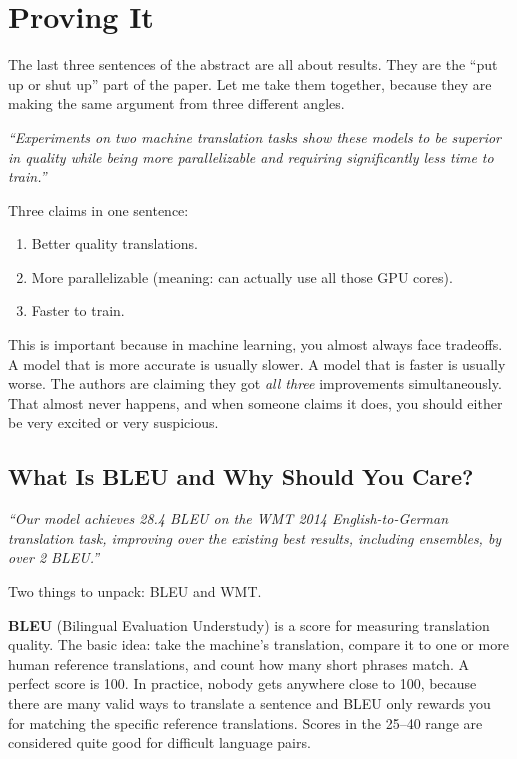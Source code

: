 \section{Proving It}

The last three sentences of the abstract are all about results.
They are the ``put up or shut up'' part of the paper.
Let me take them together, because they are making the same argument from three different angles.

\emph{``Experiments on two machine translation tasks show these models to be superior in quality while being more parallelizable and requiring significantly less time to train.''}

Three claims in one sentence:
\begin{enumerate}
    \item Better quality translations.
    \item More parallelizable (meaning: can actually use all those GPU cores).
    \item Faster to train.
\end{enumerate}

This is important because in machine learning, you almost always face tradeoffs.
A model that is more accurate is usually slower.
A model that is faster is usually worse.
The authors are claiming they got \emph{all three} improvements simultaneously.
That almost never happens, and when someone claims it does, you should either be very excited or very suspicious.

\subsection{What Is BLEU and Why Should You Care?}

\emph{``Our model achieves 28.4 BLEU on the WMT 2014 English-to-German translation task, improving over the existing best results, including ensembles, by over 2 BLEU.''}

Two things to unpack: BLEU and WMT.

\textbf{BLEU} (Bilingual Evaluation Understudy) is a score for measuring translation quality.
The basic idea: take the machine's translation, compare it to one or more human reference translations, and count how many short phrases match.
A perfect score is 100.
In practice, nobody gets anywhere close to 100, because there are many valid ways to translate a sentence and BLEU only rewards you for matching the specific reference translations.
Scores in the 25--40 range are considered quite good for difficult language pairs.

